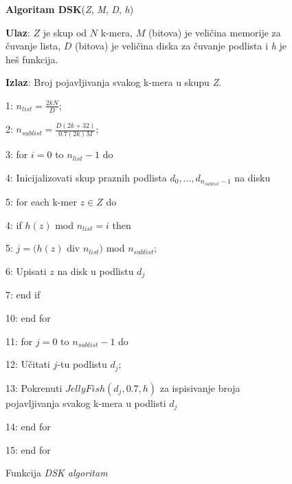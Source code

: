\documentclass[12pt,oneside]{memoir}
\begin{document}
\begin{comment}

\begin{figure}[h]
\centering
\texttt{[image: DSK5\_11.PNG]}
\caption{DSK algoritam \cite{WingKinSung}}
\label{fig:DSK}
\end{figure}

\end{comment}

\begin{figure}[!ht]
\begin{tcolorbox}
\textbf{Algoritam DSK}(\textit{Z}, \textit{M}, \textit{D}, \textit{h})

\textbf{Ulaz}: $Z$ je skup od $N$ k-mera, $M$ (bitova) je veličina memorije za čuvanje lista, $D$ (bitova) je veličina diska za čuvanje podlista i \textit{h} je heš funkcija.

\textbf{Izlaz}: Broj pojavljivanja svakog k-mera u skupu \textit{Z}.

1: $n_{list} = \frac{2kN}{D}$;

2: $n_{sublist} = \frac{D(2k + 32)}{0.7(2k)M}$;

3: for $i = 0$ to $n_{list} - 1$ do

4:\hspace{1cm} Inicijalizovati skup praznih podlista ${d_0,..., d_{n_{sublist} - 1}}$ na disku

5:\hspace{1cm} for each k-mer $z \in Z$ do

4:\hspace{2cm} if $h(z)$ mod $n_{list} = i$ then

5:\hspace{3cm} $j = (h(z)$ div $n_{list})$ mod $n_{sublist}$;

6:\hspace{3cm} Upisati $z$ na disk u podlistu $d_j$

7:\hspace{2cm} end if

10:\hspace{1cm} end for

11:\hspace{1cm} for $j = 0$ to $n_{sublist} - 1$ do

12:\hspace{2cm} Učitati $j$-tu podlistu $d_j$;

13:\hspace{2cm} Pokrenuti $JellyFish(d_j, 0.7, h)$ za ispisivanje broja pojavljivanja svakog k-mera u podlisti $d_j$

14:\hspace{1cm} end for

15: end for
\end{tcolorbox}
\caption{Funkcija \textit{DSK algoritam} \cite{WingKinSung}}
\label{box:DSK}
\end{figure}
\end{document}
